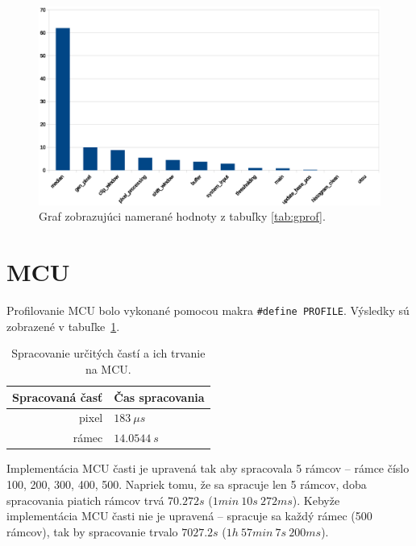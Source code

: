 \documentclass[11pt,a4paper]{article}
\begin{document}
\begin{figure}[H]
    \centering
    \includegraphics[scale=0.6]{graph.eps}
    \caption{Graf zobrazujúci namerané hodnoty z tabuľky \ref{tab:gprof}.}
    \label{fig:graf}
\end{figure}

\newpage
\section{MCU}

Profilovanie MCU bolo vykonané pomocou makra \texttt{\#define PROFILE}. Výsledky sú zobrazené v tabuľke~\ref{tab:MCU_processing}.

\begin{table}[H]
  \begin{center}
    \begin{tabular}{r|l}
        \multicolumn{1}{c|}{\textbf{Spracovaná časť}} & \multicolumn{1}{c}{\textbf{Čas spracovania}}\\
        \hline
        pixel & $183 \ \mu s$\\
        rámec & $14.0544 \ s$\\
    \end{tabular}
    \caption{Spracovanie určitých častí a ich trvanie na MCU.}
    \label{tab:MCU_processing}
  \end{center}
\end{table}

Implementácia MCU časti je upravená tak aby spracovala 5 rámcov -- rámce číslo 100, 200, 300, 400, 500. Napriek tomu, že sa spracuje len 5 rámcov, doba spracovania piatich rámcov trvá $70.272s$ ($1min \ 10s \ 272ms$). Kebyže implementácia MCU časti nie je upravená -- spracuje sa každý rámec (500 rámcov), tak by spracovanie trvalo $7027.2s$ ($1h \ 57min \ 7s \ 200ms$).
\end{document}
